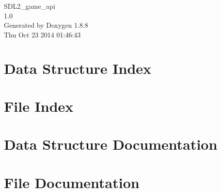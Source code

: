 \documentclass[twoside]{book}
\newcommand{\+}{\discretionary{\mbox{\scriptsize$\hookleftarrow$}}{}{}}
\newcommand{\clearemptydoublepage}{%
  \newpage{\pagestyle{empty}\cleardoublepage}%
}
\begin{document}
\hypersetup{pageanchor=false,
             bookmarks=true,
             bookmarksnumbered=true,
             pdfencoding=unicode
            }
\begin{titlepage}
\vspace*{7cm}
\begin{center}%
{\Large S\+D\+L2\+\_\+game\+\_\+api \\[1ex]\large 1.\+0 }\\
\vspace*{1cm}
{\large Generated by Doxygen 1.8.8}\\
\vspace*{0.5cm}
{\small Thu Oct 23 2014 01:46:43}\\
\end{center}
\end{titlepage}
\clearemptydoublepage
\tableofcontents
\clearemptydoublepage
{}
\hypersetup{pageanchor=true}

\chapter{Data Structure Index}

\chapter{File Index}

\chapter{Data Structure Documentation}
















\chapter{File Documentation}

































\newpage
{}
{}
\printindex
\end{document}
